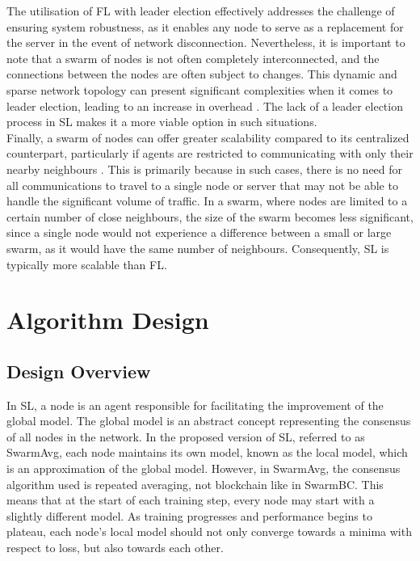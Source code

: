\documentclass[letterpaper, 10 pt, conference]{ieeeconf}  %
\begin{document}
The utilisation of FL with leader election effectively addresses the challenge of ensuring system robustness, as it enables any node to serve as a replacement for the server in the event of network disconnection. Nevertheless, it is important to note that a swarm of nodes is not often completely interconnected, and the connections between the nodes are often subject to changes. This dynamic and sparse network topology can present significant complexities when it comes to leader election, leading to an increase in overhead \cite{leaderelection}. The lack of a leader election process in SL makes it a more viable option in such situations. \\

Finally, a swarm of nodes can offer greater scalability compared to its centralized counterpart, particularly if agents are restricted to communicating with only their nearby neighbours \cite{swarmscalable}. This is primarily because in such cases, there is no need for all communications to travel to a single node or server that may not be able to handle the significant volume of traffic. In a swarm, where nodes are limited to a certain number of close neighbours, the size of the swarm becomes less significant, since a single node would not experience a difference between a small or large swarm, as it would have the same number of neighbours. Consequently, SL is typically more scalable than FL.


\section{Algorithm Design} \label{des}
\subsection{Design Overview}
In SL, a node is an agent responsible for facilitating the improvement of the global model. The global model is an abstract concept representing the consensus of all nodes in the network. In the proposed version of SL, referred to as SwarmAvg, each node maintains its own model, known as the local model, which is an approximation of the global model. However, in SwarmAvg, the consensus algorithm used is repeated averaging, not blockchain like in SwarmBC. This means that at the start of each training step, every node may start with a slightly different model. As training progresses and performance begins to plateau, each node's local model should not only converge towards a minima with respect to loss, but also towards each other. \\
\end{document}
